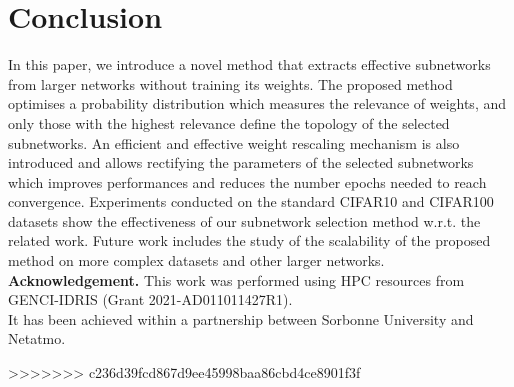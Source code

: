 \section{Conclusion}

In this paper, we introduce a novel method that extracts effective subnetworks
from larger networks without training its weights. The proposed method optimises
a probability distribution which measures the relevance of weights, and only
those with the highest relevance define the topology of the selected
subnetworks. An efficient and effective weight rescaling mechanism is also
introduced and allows rectifying the parameters of the selected subnetworks
which improves performances and reduces the number epochs needed to reach
convergence. Experiments conducted on the standard CIFAR10 and  CIFAR100
datasets show the effectiveness of our subnetwork selection method w.r.t. the
related work. Future work includes the study of the scalability of the proposed
method on more complex datasets and other larger networks.\\

\noindent\textbf{Acknowledgement.} 
This work was performed using HPC resources from GENCI-IDRIS (Grant 2021-AD011011427R1). \\
It has been achieved within a partnership between Sorbonne University and Netatmo.

>>>>>>> c236d39fcd867d9ee45998baa86cbd4ce8901f3f
